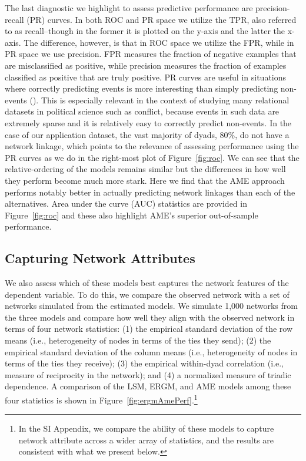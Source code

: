 \documentclass[12pt,pdflatex]{elsarticle}
\begin{document}
The last diagnostic we highlight to assess predictive performance are precision-recall (PR) curves. In both ROC and PR space we utilize the TPR, also referred to as recall--though in the former it is plotted on the y-axis and the latter the x-axis. The difference, however, is that in ROC space we utilize the FPR, while in PR space we use precision. FPR measures the fraction of negative examples that are misclassified as positive, while precision measures the fraction of examples classified as positive that are truly positive. PR curves are useful in situations where correctly predicting events is more interesting than simply predicting non-events (\citealt{davis:goadrich:2006}). This is especially relevant in the context of studying many relational datasets in political science such as conflict, because events in such data are extremely sparse and it is relatively easy to correctly predict non-events. In the case of our application dataset, the vast majority of dyads, 80\%, do not have a network linkage, which points to the relevance of assessing performance using the PR curves as we do in the right-most plot of Figure~\ref{fig:roc}. We can see that the relative-ordering of the models remains similar but the differences in how well they perform become much more stark. Here we find that the AME approach performs notably better in actually predicting network linkages than each of the alternatives. Area under the curve (AUC) statistics are provided in Figure~\ref{fig:roc} and these also highlight AME's superior out-of-sample performance.


\FloatBarrier

\subsection*{Capturing Network Attributes}

We also assess which of these models best captures the network features of the dependent variable. To do this, we compare the observed network with a set of networks simulated from the estimated models. We simulate 1,000 networks from the three models and compare how well they align with the observed network in terms of four network statistics: (1) the empirical standard deviation of the row means (i.e., heterogeneity of nodes in terms of the ties they send); (2) the empirical standard deviation of the column means (i.e., heterogeneity of nodes in terms of the ties they receive); (3) the empirical within-dyad correlation (i.e., measure of reciprocity in the network); and (4) a normalized measure of triadic dependence. A comparison of the LSM, ERGM, and AME models among these four statistics is shown in Figure~\ref{fig:ergmAmePerf}.\footnote{In the SI Appendix, we compare the ability of these models to capture network attribute across a wider array of statistics, and the results are consistent with what we present below.}
\end{document}
